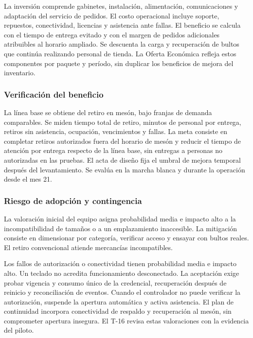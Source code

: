 \documentclass[11pt]{article}
\begin{document}
La inversión comprende gabinetes, instalación, alimentación, comunicaciones y adaptación del servicio de pedidos. El costo operacional incluye soporte, repuestos, conectividad, licencias y asistencia ante fallas. El beneficio se calcula con el tiempo de entrega evitado y con el margen de pedidos adicionales atribuibles al horario ampliado. Se descuenta la carga y recuperación de bultos que continúa realizando personal de tienda. La Oferta Económica refleja estos componentes por paquete y período, sin duplicar los beneficios de mejora del inventario.

\subsubsection{Verificación del beneficio}\label{verificaciuxf3n-del-beneficio}

La línea base se obtiene del retiro en mesón, bajo franjas de demanda comparables. Se miden tiempo total de retiro, minutos de personal por entrega, retiros sin asistencia, ocupación, vencimientos y fallas. La meta consiste en completar retiros autorizados fuera del horario de mesón y reducir el tiempo de atención por entrega respecto de la línea base, sin entregas a personas no autorizadas en las pruebas. El acta de diseño fija el umbral de mejora temporal después del levantamiento. Se evalúa en la marcha blanca y durante la operación desde el mes 21.

\subsubsection{Riesgo de adopción y contingencia}\label{riesgo-de-adopciuxf3n-y-contingencia}

La valoración inicial del equipo asigna probabilidad media e impacto alto a la incompatibilidad de tamaños o a un emplazamiento inaccesible. La mitigación consiste en dimensionar por categoría, verificar acceso y ensayar con bultos reales. El retiro convencional atiende mercancías incompatibles.

Los fallos de autorización o conectividad tienen probabilidad media e impacto alto. Un teclado no acredita funcionamiento desconectado. La aceptación exige probar vigencia y consumo único de la credencial, recuperación después de reinicio y reconciliación de eventos. Cuando el controlador no puede verificar la autorización, suspende la apertura automática y activa asistencia. El plan de continuidad incorpora conectividad de respaldo y recuperación al mesón, sin comprometer apertura insegura. El T-16 revisa estas valoraciones con la evidencia del piloto.
\end{document}
